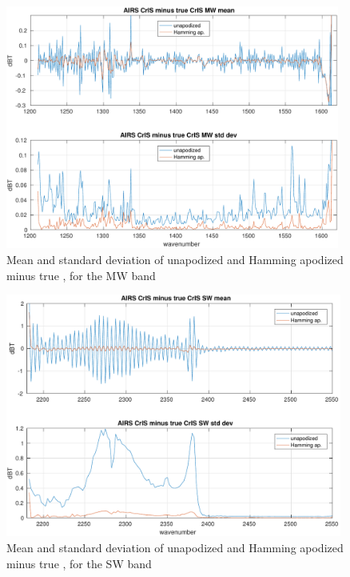 \documentclass[12pt]{article}
\begin{document}
\begin{figure} %
  \centering
  \includegraphics[height=8cm]{figures/a2cris_diff_MW.pdf}
  \caption{Mean and standard deviation of unapodized and Hamming
    apodized {\airs} {\cris} minus true {\cris}, for the {\cris} MW
    band}
  \label{diffMW}
\end{figure}

\begin{figure} %
  \centering
  \includegraphics[height=8cm]{figures/a2cris_diff_SW.pdf}
  \caption{Mean and standard deviation of unapodized and Hamming
    apodized {\airs} {\cris} minus true {\cris}, for the {\cris} SW
    band}
  \label{diffSW}
\end{figure}
\end{document}
